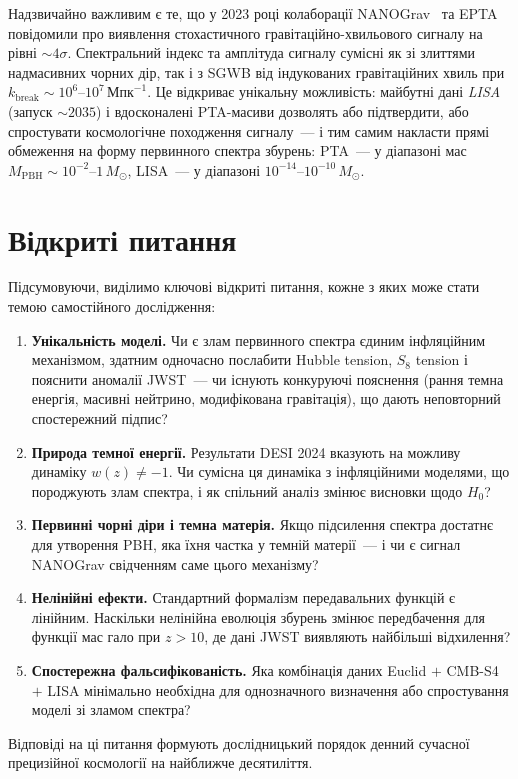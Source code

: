 Надзвичайно важливим є те, що у 2023 році колаборації NANOGrav~\cite{NANOGrav2023} та EPTA повідомили про виявлення стохастичного гравітаційно-хвильового сигналу на рівні $\sim 4\sigma$. Спектральний індекс та амплітуда сигналу сумісні як зі злиттями надмасивних чорних дір, так і з SGWB від індукованих гравітаційних хвиль при $k_\mathrm{break} \sim 10^6$--$10^7\,\text{Мпк}^{-1}$. Це відкриває унікальну можливість: майбутні дані \emph{LISA} (запуск $\sim 2035$) і вдосконалені PTA-масиви дозволять або підтвердити, або спростувати космологічне походження сигналу~--- і тим самим накласти прямі обмеження на форму первинного спектра збурень: PTA~--- у діапазоні мас $M_\mathrm{PBH} \sim 10^{-2}$--$1\,M_\odot$, LISA~--- у діапазоні $10^{-14}$--$10^{-10}\,M_\odot$.

\section*{Відкриті питання}
\label{sec:open_questions}

Підсумовуючи, виділимо ключові відкриті питання, кожне з яких може стати темою самостійного дослідження:

\begin{enumerate}
  \item \textbf{Унікальність моделі.} Чи є злам первинного спектра єдиним інфляційним механізмом, здатним одночасно послабити Hubble tension, $S_8$ tension і пояснити аномалії JWST~--- чи існують конкуруючі пояснення (рання темна енергія, масивні нейтрино, модифікована гравітація), що дають неповторний спостережний підпис?

  \item \textbf{Природа темної енергії.} Результати DESI 2024 вказують на можливу динаміку $w(z) \neq -1$. Чи сумісна ця динаміка з інфляційними моделями, що породжують злам спектра, і як спільний аналіз змінює висновки щодо $H_0$?

  \item \textbf{Первинні чорні діри і темна матерія.} Якщо підсилення спектра достатнє для утворення PBH, яка їхня частка у темній матерії~--- і чи є сигнал NANOGrav свідченням саме цього механізму?

  \item \textbf{Нелінійні ефекти.} Стандартний формалізм передавальних функцій є лінійним. Наскільки нелінійна еволюція збурень змінює передбачення для функції мас гало при $z > 10$, де дані JWST виявляють найбільші відхилення?

  \item \textbf{Спостережна фальсифікованість.} Яка комбінація даних Euclid $+$ CMB-S4 $+$ LISA мінімально необхідна для однозначного визначення або спростування моделі зі зламом спектра?
\end{enumerate}

Відповіді на ці питання формують дослідницький порядок денний сучасної прецизійної космології на найближче десятиліття.